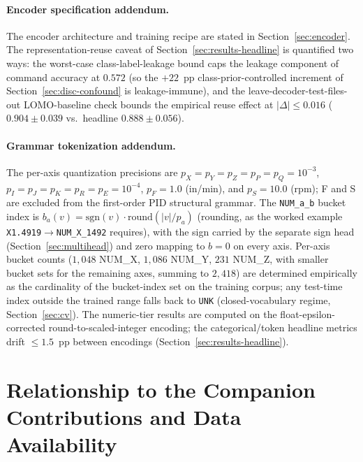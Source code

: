 \documentclass[sensors,article,submit,moreauthors,pdftex]{Definitions/mdpi}
\begin{document}
\paragraph{Encoder specification addendum.} The encoder architecture and training recipe are stated in Section~\ref{sec:encoder}. The representation-reuse caveat of Section~\ref{sec:results-headline} is quantified two ways: the worst-case class-label-leakage bound caps the leakage component of command accuracy at $0.572$ (so the $+22$~pp class-prior-controlled increment of Section~\ref{sec:disc-confound} is leakage-immune), and the leave-decoder-test-files-out LOMO-baseline check bounds the empirical reuse effect at $|\Delta|\!\le\!0.016$ ($0.904 \pm 0.039$ vs.\ headline $0.888 \pm 0.056$).

\paragraph{Grammar tokenization addendum.} The per-axis quantization precisions are $p_X\!=\!p_Y\!=\!p_Z\!=\!p_P\!=\!p_Q\!=\!10^{-3}$, $p_I\!=\!p_J\!=\!p_K\!=\!p_R\!=\!p_E\!=\!10^{-4}$, $p_F\!=\!1.0$ (in/min), and $p_S\!=\!10.0$ (rpm); F and S are excluded from the first-order PID structural grammar. The \texttt{NUM\_a\_b} bucket index is $b_a(v) = \mathrm{sgn}(v)\cdot\mathrm{round}(|v|/p_a)$ (rounding, as the worked example \texttt{X1.4919}$\to$\texttt{NUM\_X\_1492} requires), with the sign carried by the separate sign head (Section~\ref{sec:multihead}) and zero mapping to $b\!=\!0$ on every axis. Per-axis bucket counts ($1{,}048$ NUM\_X, $1{,}086$ NUM\_Y, $231$ NUM\_Z, with smaller bucket sets for the remaining axes, summing to $2{,}418$) are determined empirically as the cardinality of the bucket-index set on the training corpus; any test-time index outside the trained range falls back to \texttt{UNK} (closed-vocabulary regime, Section~\ref{sec:cv}). The numeric-tier results are computed on the float-epsilon-corrected round-to-scaled-integer encoding; the categorical/token headline metrics drift $\le\!1.5$~pp between encodings (Section~\ref{sec:results-headline}).


\section{Relationship to the Companion Contributions and Data Availability}
\label{app:companion}
\end{document}
